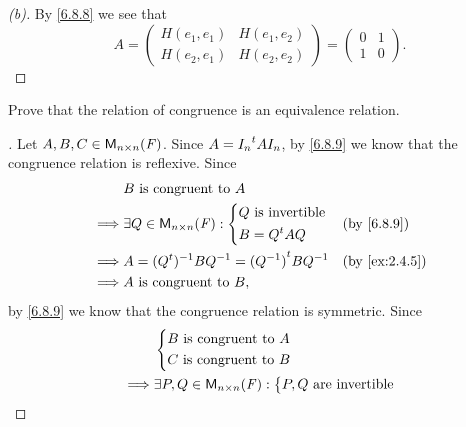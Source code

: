 \begin{proof}[(b)]
  By \cref{6.8.8} we see that
  \[
    A = \begin{pmatrix}
      H(e_1, e_1) & H(e_1, e_2) \\
      H(e_2, e_1) & H(e_2, e_2)
    \end{pmatrix} = \begin{pmatrix}
      0 & 1 \\
      1 & 0
    \end{pmatrix}.
  \]
\end{proof}

\begin{ex}\label{ex:6.8.12}
  Prove that the relation of congruence is an equivalence relation.
\end{ex}

\begin{proof}[]
  Let \(A, B, C \in \ms[n][n][\F]\).
  Since \(A = {I_n}^{t} A I_n\), by \cref{6.8.9} we know that the congruence relation is reflexive.
  Since
  \begin{align*}
             & B \text{ is congruent to } A                                           \\
    \implies & \exists Q \in \ms[n][n][\F] : \begin{dcases}
                                               Q \text{ is invertible} \\
                                               B = \tp{Q} A Q
                                             \end{dcases}        &  & \by{6.8.9}      \\
    \implies & A = (\tp{Q})^{-1} B Q^{-1} = \tp{(Q^{-1})} B Q^{-1} &  & \by{ex:2.4.5} \\
    \implies & A \text{ is congruent to } B,
  \end{align*}
  by \cref{6.8.9} we know that the congruence relation is symmetric.
  Since
  \begin{align*}
             & \begin{dcases}
                 B \text{ is congruent to } A \\
                 C \text{ is congruent to } B
               \end{dcases}                                    \\
    \implies & \exists P, Q \in \ms[n][n][\F] : \begin{dcases}
                                                  P, Q \text{ are invertible} \\

\end{dcases}
\end{align*}
\end{proof}

